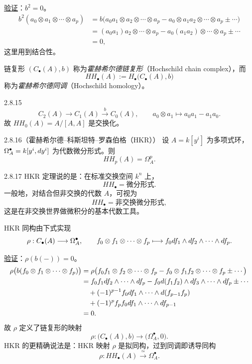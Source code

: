 \underline{验证}：$b^2=0$。
\[
\begin{aligned}
b^2(a_0\otimes a_1\otimes\cdots\otimes a_p)
&=b\bigl(a_0a_1\otimes a_2\otimes\cdots\otimes a_p
-a_0\otimes a_1a_2\otimes\cdots\otimes a_p\pm\cdots\bigr)\\
&=(a_0a_1)a_2\otimes\cdots\otimes a_p-a_0(a_1a_2)\otimes\cdots\otimes a_p\pm\cdots\\
&=0,
\end{aligned}
\]
这里用到结合性。

链复形 $(C_\bullet(A),b)$ 称为\emph{霍赫希尔德链复形}（Hochschild chain complex），而
\[
HH_\bullet(A):=H_\bullet\bigl(C_\bullet(A),b\bigr)
\]
称为\emph{霍赫希尔德同调}（Hochschild homology）。

\begin{example}{2.8.15}
  \[
  C_2(A)\longrightarrow C_1(A)\xrightarrow{\ b\ }C_0(A),\qquad
  a_0\otimes a_1\longmapsto a_0a_1-a_1a_0.
  \]
  故 $HH_0(A)=A/[A,A]$ 是交换化。
\end{example}

\begin{theorem}{2.8.16}（霍赫希尔德–科斯坦特–罗森伯格（HKR））
  设 $A=k[y^i]$ 为多项式环，$\Omega^\bullet_A=k[y^i,d y^i]$ 为代数微分形式。则
  \[
  HH_p(A)=\Omega^p_A.
  \]
\end{theorem}

\begin{remark}{2.8.17}
  HKR 定理说的是：在标准交换空间 $k^n$ 上，
  \[
  HH_\bullet=\text{微分形式}.
  \]
  一般地，对结合但非交换的代数 $A$，可视为
  \[
  HH_\bullet=\text{非交换微分形式},
  \]
  这是在非交换世界做微积分的基本代数工具。
\end{remark}

HKR 同构由下式实现
\[
\rho:C_\bullet(A)\longrightarrow\Omega^\bullet_A,\qquad
f_0\otimes f_1\otimes\cdots\otimes f_p
\longmapsto f_0d f_1\wedge d f_2\wedge\cdots\wedge d f_p.
\]

\underline{验证}：$\rho(b(-))=0$。
\[
\begin{aligned}
\rho\bigl(b(f_0\otimes f_1\otimes\cdots\otimes f_p)\bigr)
&=\rho\bigl(f_0f_1\otimes f_2\otimes\cdots\otimes f_p
-f_0\otimes f_1f_2\otimes\cdots\otimes f_p\pm\cdots\bigr)\\
&=f_0f_1d f_2\wedge\cdots\wedge d f_p
-f_0d(f_1f_2)\wedge d f_3\wedge\cdots\wedge d f_p\pm\cdots\\
&\quad+(-1)^{p-1}f_0d f_1\wedge\cdots\wedge d(f_{p-1}f_p)\\
&\quad+(-1)^pf_pf_0d f_1\wedge\cdots\wedge d f_{p-1}\\
&=0.
\end{aligned}
\]
故 $\rho$ 定义了链复形的映射
\[
\rho:\bigl(C_\bullet(A),b\bigr)\longrightarrow\bigl(\Omega^\bullet_A,0\bigr).
\]
HKR 的更精确说法是：HKR 映射 $\rho$ 是拟同构，过到同调即诱导同构
\[
\rho:HH_\bullet(A)\xrightarrow{\ \simeq\ }\Omega^\bullet_A.
\]

